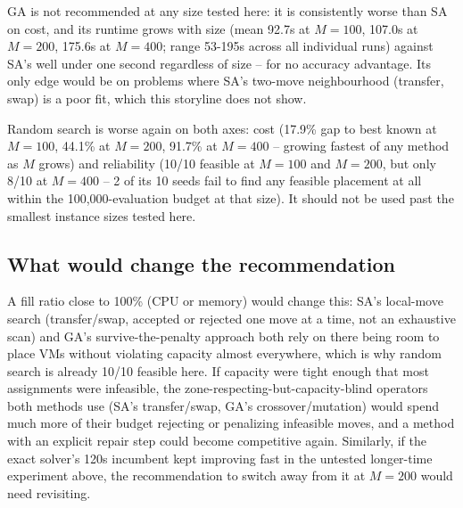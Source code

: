 \documentclass[11pt,a4paper]{article}
\begin{document}
GA is not recommended at any size tested here: it is consistently worse than SA on cost, and its runtime grows with size (mean 92.7s at $M{=}100$, 107.0s at $M{=}200$, 175.6s at $M{=}400$; range 53-195s across all individual runs) against SA's well under one second regardless of size -- for no accuracy advantage. Its only edge would be on problems where SA's two-move neighbourhood (transfer, swap) is a poor fit, which this storyline does not show.

Random search is worse again on both axes: cost (17.9\% gap to best known at $M{=}100$, 44.1\% at $M{=}200$, 91.7\% at $M{=}400$ -- growing fastest of any method as $M$ grows) and reliability (10/10 feasible at $M{=}100$ and $M{=}200$, but only 8/10 at $M{=}400$ -- 2 of its 10 seeds fail to find any feasible placement at all within the 100{,}000-evaluation budget at that size). It should not be used past the smallest instance sizes tested here.

\subsection*{What would change the recommendation}
A fill ratio close to 100\% (CPU or memory) would change this: SA's local-move search (transfer/swap, accepted or rejected one move at a time, not an exhaustive scan) and GA's survive-the-penalty approach both rely on there being room to place VMs without violating capacity almost everywhere, which is why random search is already 10/10 feasible here. If capacity were tight enough that most assignments were infeasible, the zone-respecting-but-capacity-blind operators both methods use (SA's transfer/swap, GA's crossover/mutation) would spend much more of their budget rejecting or penalizing infeasible moves, and a method with an explicit repair step could become competitive again. Similarly, if the exact solver's 120s incumbent kept improving fast in the untested longer-time experiment above, the recommendation to switch away from it at $M{=}200$ would need revisiting.

\appendix
\end{document}

